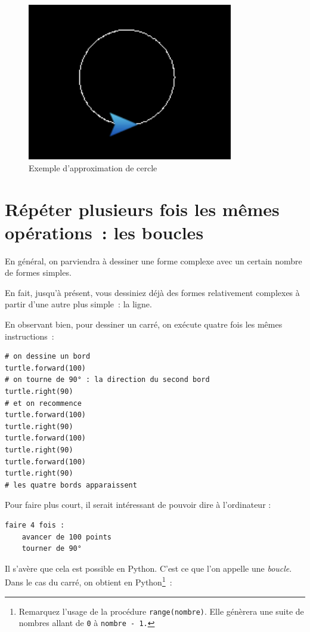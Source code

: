 \documentclass[11pt,a4paper]{article}
\begin{document}
\begin{figure}
    \centering
    \includegraphics[width=0.8\textwidth]{img/approx_circle}
    \caption{Exemple d'approximation de cercle}
    \label{fig:circle}
\end{figure}

\section{Répéter plusieurs fois les mêmes opérations~: les boucles}

En général, on parviendra à dessiner une forme complexe avec un certain nombre
de formes simples.

En fait, jusqu'à présent, vous dessiniez déjà des formes relativement complexes
à partir d'une autre plus simple~: la ligne.

En observant bien, pour dessiner un carré, on exécute quatre fois les mêmes
instructions~:

\begin{lstlisting}
# on dessine un bord
turtle.forward(100)
# on tourne de 90° : la direction du second bord
turtle.right(90)
# et on recommence
turtle.forward(100)
turtle.right(90)
turtle.forward(100)
turtle.right(90)
turtle.forward(100)
turtle.right(90)
# les quatre bords apparaissent
\end{lstlisting}

Pour faire plus court, il serait intéressant de pouvoir dire à
l'ordinateur :

\begin{lstlisting}
faire 4 fois :
    avancer de 100 points
    tourner de 90°
\end{lstlisting}

Il s'avère que cela est possible en Python. C'est ce que l'on appelle une
\emph{boucle}. Dans le cas du carré, on obtient en Python\footnote{Remarquez
l'usage de la procédure \lstinline{range(nombre)}. Elle génèrera une suite de
nombres allant de \lstinline{0} à \lstinline{nombre - 1.}}~:
\end{document}
